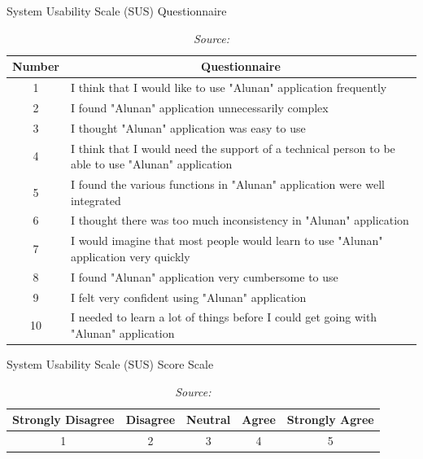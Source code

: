 \begin{table}[htb]
\caption{System Usability Scale (SUS) Questionnaire}
\caption*{\textit{Source: \textcite{brooke95}}} 
\label{tab:mytable}
\centering
\begin{tabular}{|p{3cm}|p{12cm}|}
\hline
\multicolumn{1}{|c|}{\textbf{Number}} & 
\multicolumn{1}{c|}{\textbf{Questionnaire}} \\
\hline 
\multicolumn{1}{|c|}{1} & I think that I would like to use "Alunan" application frequently \\ \hline
\multicolumn{1}{|c|}{2} & I found "Alunan" application unnecessarily complex \\ \hline
\multicolumn{1}{|c|}{3} & I thought "Alunan" application was easy to use \\ \hline
\multicolumn{1}{|c|}{4} & I think that I would need the support of a technical person to be able to use "Alunan" application \\ \hline
\multicolumn{1}{|c|}{5} & I found the various functions in "Alunan" application were well integrated \\ \hline
\multicolumn{1}{|c|}{6} & I thought there was too much inconsistency in "Alunan" application \\ \hline
\multicolumn{1}{|c|}{7} & I would imagine that most people would learn to use "Alunan" application very quickly \\ \hline
\multicolumn{1}{|c|}{8} & I found "Alunan" application very cumbersome to use \\ \hline
\multicolumn{1}{|c|}{9} & I felt very confident using "Alunan" application \\ \hline
\multicolumn{1}{|c|}{10} & I needed to learn a lot of things before I could get going with "Alunan" application \\ \hline
\end{tabular}
\end{table}

\begin{table}[htb]
\caption{System Usability Scale (SUS) Score Scale}
\caption*{\textit{Source: \textcite{brooke95}}} 
\label{tab:mytable}
\centering
\begin{tabular}{|p{5cm}|p{10cm}|p{10cm}|p{10cm}|p{5cm}|}
\hline
\multicolumn{1}{|c|}{\textbf{Strongly Disagree}} & 
\multicolumn{1}{c|}{\textbf{Disagree}} & 
\multicolumn{1}{c|}{\textbf{Neutral}} & 
\multicolumn{1}{c|}{\textbf{Agree}} & 
\multicolumn{1}{c|}{\textbf{Strongly Agree}} \\
\hline 
\multicolumn{1}{|c|}{1} & \multicolumn{1}{c|}{2} & \multicolumn{1}{c|}{3} & \multicolumn{1}{c|}{4} & \multicolumn{1}{c|}{5}\\ \hline
\end{tabular}
\end{table}
\pagebreak

